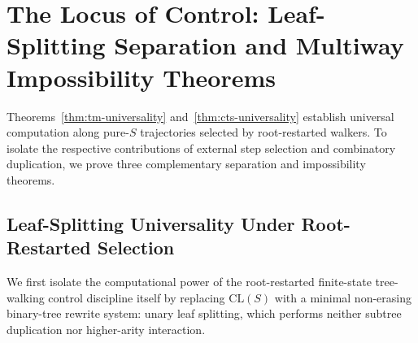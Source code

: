 \documentclass[11pt,reqno]{amsart}
\numberwithin{equation}{section}
\theoremstyle{plain}
\theoremstyle{definition}
\theoremstyle{remark}
\newcommand{\CLS}{\mathrm{CL}(S)}
\begin{document}
\section{The Locus of Control: Leaf-Splitting Separation and Multiway Impossibility Theorems}\label{sec:separation}

Theorems~\ref{thm:tm-universality} and~\ref{thm:cts-universality} establish universal computation along pure-$S$ trajectories selected by root-restarted walkers. To isolate the respective contributions of external step selection and combinatory duplication, we prove three complementary separation and impossibility theorems.

\subsection{Leaf-Splitting Universality Under Root-Restarted Selection}\label{subsec:leaf-split}

We first isolate the computational power of the root-restarted finite-state tree-walking control discipline itself by replacing $\CLS$ with a minimal non-erasing binary-tree rewrite system: unary leaf splitting, which performs neither subtree duplication nor higher-arity interaction.
\end{document}
